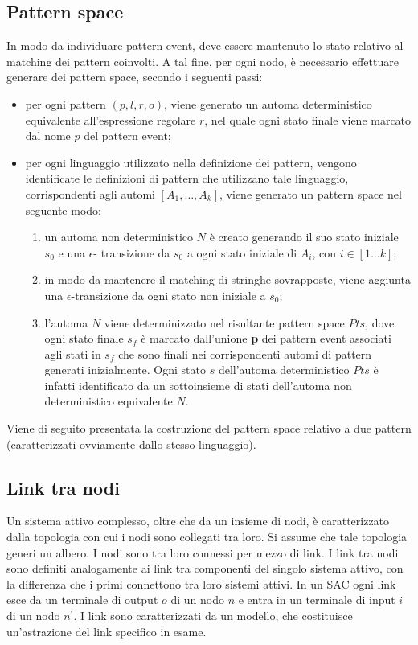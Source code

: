 \subsection{Pattern space}
In modo da individuare pattern event, deve essere mantenuto lo stato relativo al matching dei pattern coinvolti. A tal fine, per ogni nodo, è necessario effettuare generare dei pattern space, secondo i seguenti passi:
\begin{itemize}
\item per ogni pattern $(p,l,r,o)$, viene generato un automa deterministico equivalente all'espressione regolare $r$, nel quale ogni stato finale viene marcato dal nome $p$ del pattern event;
\item per ogni linguaggio utilizzato nella definizione dei pattern, vengono identificate le definizioni di pattern che utilizzano tale linguaggio, corrispondenti agli automi $[A_1, \ldots , A_k]$, viene generato un pattern space nel seguente modo:
	\begin{enumerate}
	\item un automa non deterministico $N$ è creato generando il suo stato iniziale $s_0$ e una $\epsilon$-			transizione da $s_0$ a ogni stato iniziale di $A_i$, con $i \in [1 \ldots k]$;
	\item in modo da mantenere il matching di stringhe sovrapposte, viene aggiunta una $\epsilon$-transizione	da ogni stato non iniziale a $s_0$;
	\item l'automa $N$ viene determinizzato nel risultante pattern space $Pts$, dove ogni stato finale $s_f$ è marcato dall'unione \textbf{p} dei pattern event associati agli stati in $s_f$ che sono finali nei corrispondenti automi di pattern generati inizialmente. Ogni stato $s$ dell'automa deterministico $Pts$ è infatti identificato da un sottoinsieme di stati dell'automa non deterministico equivalente $N$.
	\end{enumerate}
\end{itemize}

\begin{ex}
Viene di seguito presentata la costruzione del pattern space relativo a due pattern (caratterizzati ovviamente dallo stesso linguaggio).
\end{ex}

\subsection{Link tra nodi}
Un sistema attivo complesso, oltre che da un insieme di nodi, è caratterizzato dalla topologia con cui i nodi sono collegati tra loro. Si assume che tale topologia generi un albero.
I nodi sono tra loro connessi per mezzo di link. I link tra nodi sono definiti analogamente ai link tra componenti del singolo sistema attivo, con la differenza che i primi connettono tra loro sistemi attivi.
In un SAC ogni link esce da un terminale di output $o$ di un nodo $n$ e entra in un terminale di input $i$ di un nodo $n^\prime$.
I link sono caratterizzati da un modello, che costituisce un'astrazione del link specifico in esame.

